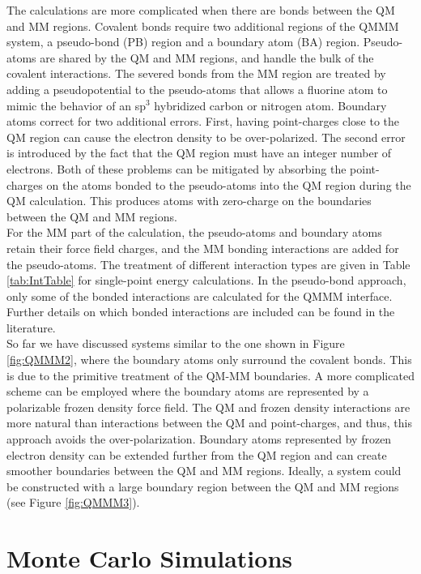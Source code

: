 \documentclass[12pt]{report}
\begin{document}
The calculations are more complicated when there are bonds between the QM and
MM regions.
Covalent bonds require two additional regions of the QMMM system,
a pseudo-bond (PB) region and a boundary atom (BA) region.
Pseudo-atoms are shared by the QM and MM regions, and handle the bulk of the
covalent interactions.
The severed bonds from the MM region are treated by adding a pseudopotential
to the pseudo-atoms that allows a fluorine atom to mimic the behavior of an
sp$^3$ hybridized carbon or nitrogen atom.
Boundary atoms correct for two additional errors.
First, having point-charges close to the QM region can cause the electron
density to be over-polarized.
The second error is introduced by the fact that the QM region must have an
integer number of electrons.
Both of these problems can be mitigated by absorbing the point-charges on the
atoms bonded to the pseudo-atoms into the QM region during the QM calculation.
This produces atoms with zero-charge on the boundaries between the QM and MM
regions. \\

For the MM part of the calculation, the pseudo-atoms and boundary atoms retain
their force field charges, and the MM bonding interactions are added for the
pseudo-atoms.
The treatment of different interaction types are given in Table
\ref{tab:IntTable} for single-point energy calculations.
In the pseudo-bond approach, only some of the bonded interactions are
calculated for the QMMM interface.
Further details on which bonded interactions are included can be found in the
literature. \\

So far we have discussed systems similar to the one shown in Figure
\ref{fig:QMMM2}, where the boundary atoms only surround the covalent bonds.
This is due to the primitive treatment of the QM-MM boundaries.
A more complicated scheme can be employed where the boundary atoms are
represented by a polarizable frozen density force field.
The QM and frozen density interactions are more natural than interactions
between the QM and point-charges, and thus, this approach avoids the
over-polarization.
Boundary atoms represented by frozen electron density can be extended further
from the QM region and can create smoother boundaries between the QM and MM
regions.
Ideally, a system could be constructed with a large boundary region between
the QM and MM regions (see Figure \ref{fig:QMMM3}).

\section{Monte Carlo Simulations}
\end{document}
